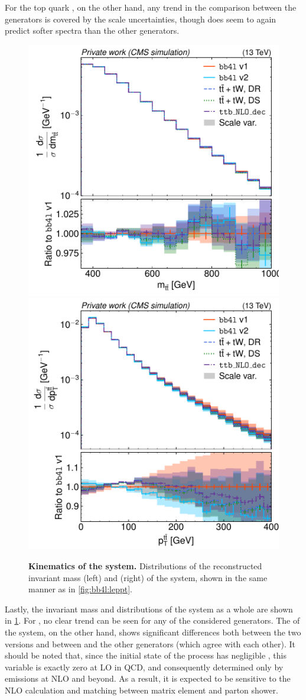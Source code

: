 For the top quark \pt, on the other hand, any trend in the comparison between the generators is covered by the scale uncertainties, though \bbfourl does seem to again predict softer \pt spectra than the other generators.

\begin{figure}[tp]
    \centering
    \includegraphics[width=0.49 \textwidth]{figures/bb4l/generators/MC_TTBAR_DILEP_SPINDENSITY_ttbar_mass.pdf}
    \hfill
    \includegraphics[width=0.49 \textwidth]{figures/bb4l/generators/MC_TTBAR_DILEP_SPINDENSITY_ttbar_pt.pdf}
    \caption{\textbf{Kinematics of the \ttbar system.} Distributions of the reconstructed invariant mass (left) and \pt (right) of the \ttbar system, shown in the same manner as in \cref{fig:bb4l:leppt}.}
    \label{fig:bb4l:ttbar}
\end{figure}

Lastly, the invariant mass and \pt distributions of the \ttbar system as a whole are shown in \cref{fig:bb4l:ttbar}. For \mtt, no clear trend can be seen for any of the considered generators. The \pt of the \ttbar system, on the other hand, shows significant differences both between the two \bbfourl versions and between \bbfourl and the other generators (which agree with each other). It should be noted that, since the initial state of the \pptt process has negligible \pt, this variable is exactly zero at LO in QCD, and consequently determined only by emissions at NLO and beyond. As a result, it is expected to be sensitive to the NLO calculation and matching between matrix element and parton shower.

